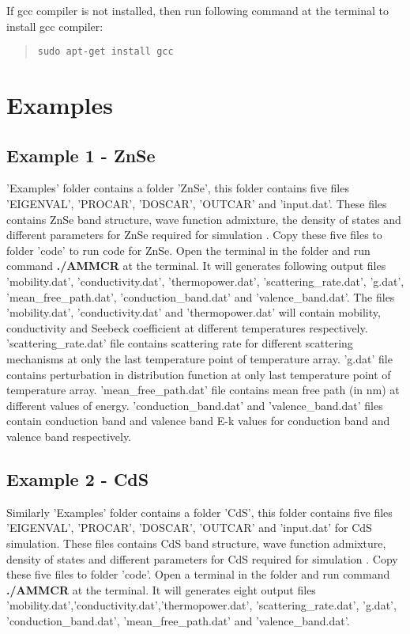\documentclass[12pt]{article}
\begin{document}
If gcc compiler is not installed, then run following command at the terminal to install gcc compiler: 

\begin{quote}
\begin{verbatim}
sudo apt-get install gcc
\end{verbatim}
\end{quote}

\section{Examples} \label{examples}
\subsection{Example 1 - ZnSe}
'Examples' folder contains a folder 'ZnSe', this folder contains five files 'EIGENVAL', 'PROCAR', 'DOSCAR', 'OUTCAR' and 'input.dat'. These files contains ZnSe band structure, wave function admixture, the density of states and different parameters for ZnSe required for simulation \cite{paper1}. Copy these five files to folder 'code' to run code for ZnSe. Open the terminal in the folder and run command \textbf{./AMMCR} at the terminal. It will generates following output files 'mobility.dat', 'conductivity.dat', 'thermopower.dat', 'scattering\_rate.dat', 'g.dat', 'mean\_free\_path.dat', 'conduction\_band.dat' and 'valence\_band.dat'. The files 'mobility.dat', 'conductivity.dat' and 'thermopower.dat' will contain mobility, conductivity and  Seebeck coefficient at different temperatures respectively. 'scattering\_rate.dat' file contains scattering rate for different scattering mechanisms at only the last temperature point of temperature array. 'g.dat' file contains perturbation in distribution function at only last temperature point of temperature array. 'mean\_free\_path.dat' file contains mean free path (in nm) at different values of energy. 'conduction\_band.dat' and 'valence\_band.dat' files contain conduction band and valence band E-k values for conduction band and valence band respectively.
 
\subsection{Example 2 - CdS}
Similarly 'Examples' folder contains a folder 'CdS', this folder contains five files 'EIGENVAL', 'PROCAR', 'DOSCAR', 'OUTCAR' and 'input.dat' for CdS simulation. These files contains CdS band structure, wave function admixture, density of states and different parameters for CdS required for simulation \cite{paper2}. Copy these five files to folder 'code'. Open a terminal in the folder and run command \textbf{./AMMCR} at the terminal. It will generates eight output files 'mobility.dat','conductivity.dat','thermopower.dat', 'scattering\_rate.dat', 'g.dat', 'conduction\_band.dat', 'mean\_free\_path.dat' and 'valence\_band.dat'. 



\end{document}
